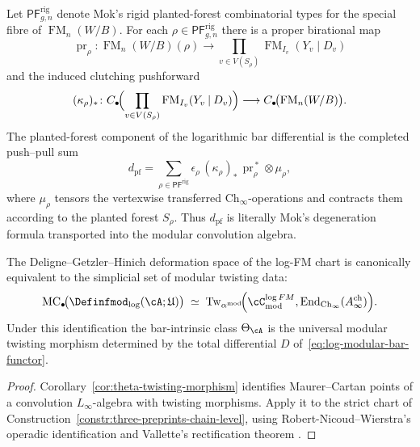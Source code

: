 \begin{construction}
\label{constr:rigid-planted-forest-push-pull}
Let $\mathsf{PF}^{\mathrm{rig}}_{g,n}$ denote Mok's rigid planted-forest
combinatorial types for the special fibre of $\operatorname{FM}_n(W/B)$.  For
each $\rho\in \mathsf{PF}^{\mathrm{rig}}_{g,n}$ there is a proper birational
map
\[
\operatorname{pr}_\rho\colon
\operatorname{FM}_n(W/B)(\rho)
\longrightarrow
\prod_{v\in V(S_\rho)}
\operatorname{FM}_{I_v}(Y_v\mathbin{|}D_v)
\]
and the induced clutching pushforward
\[
(\kappa_\rho)_*\colon
C_\bullet\!\Bigl(
\prod_{v\in V(S_\rho)}
\operatorname{FM}_{I_v}(Y_v\mathbin{|}D_v)
\Bigr)
\longrightarrow
C_\bullet\!\bigl(\operatorname{FM}_n(W/B)\bigr).
\]
The planted-forest component of the logarithmic bar differential is the
completed push--pull sum
\begin{equation}
\label{eq:dpf-push-pull}
d_{\mathrm{pf}}
=
\sum_{\rho\in \mathsf{PF}^{\mathrm{rig}}}
\epsilon_\rho\,
(\kappa_\rho)_*\,\operatorname{pr}_\rho^{\,*}\otimes \mu_\rho,
\end{equation}
where $\mu_\rho$ tensors the vertexwise transferred
$\mathrm{Ch}_\infty$-operations and contracts them according to the planted
forest $S_\rho$.  Thus $d_{\mathrm{pf}}$ is literally Mok's degeneration
formula transported into the modular convolution algebra.
\end{construction}

\begin{corollary}
\label{cor:theta-log-fm-twisting-data}
The Deligne--Getzler--Hinich deformation space of the log-FM chart is
canonically equivalent to the simplicial set of modular twisting data:
\[
\operatorname{MC}_\bullet\!\bigl(
\Definfmod_{\log}(\cA;\mathfrak U)
\bigr)
\;\simeq\;
\operatorname{Tw}_{\alpha^{\mathrm{mod}}}\!\Bigl(
\cC^{\log FM}_{\mathrm{mod}},
\operatorname{End}_{\mathrm{Ch}_\infty}(A^{\mathrm{ch}}_\infty)
\Bigr).
\]
Under this identification the bar-intrinsic class $\Theta_\cA$ is the
universal modular twisting morphism determined by the total differential
$D$ of~\eqref{eq:log-modular-bar-functor}.
\end{corollary}

\begin{proof}
Corollary~\ref{cor:theta-twisting-morphism} identifies Maurer--Cartan points
of a convolution $L_\infty$-algebra with twisting morphisms.  Apply it to the
strict chart of Construction~\ref{constr:three-preprints-chain-level}, using
Robert-Nicoud--Wierstra's operadic identification
\cite[Theorem~4.1]{RNW19} and Vallette's rectification theorem
\cite[Theorem~1.2]{Val16}.
\end{proof}

